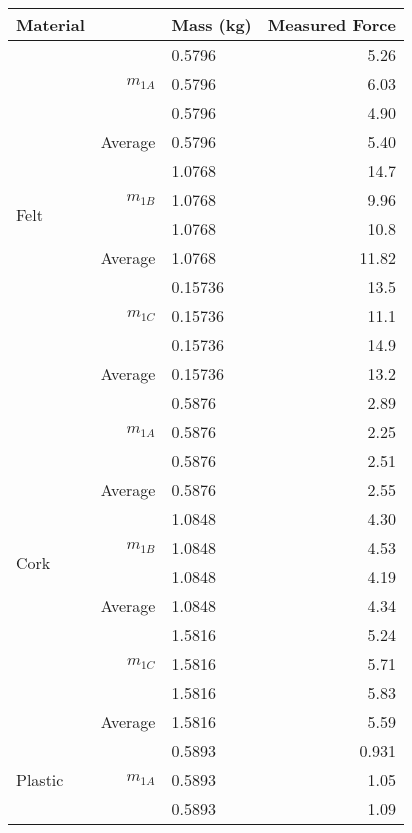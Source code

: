 \documentclass [12pt, letterpaper, twoside] {article}
\begin{document}
\begin {table}[h]
  \centering
  \begin {tabular} {| l | r | l | r |}
    \hline\hline 
    Material & & Mass (kg) & Measured Force \\
    \hline
    \multirow {12}{*}{Felt} & \multirow {3}{*}{\(m_{1A}\)} & 0.5796 & 5.26 \\
    & & 0.5796 & 6.03 \\
    & & 0.5796 & 4.90 \\
    \cline{2-4}
    & Average & 0.5796 & 5.40 \\ %
    \cline{2-4}
    & \multirow {3}{*}{\(m_{1B}\)} & 1.0768 & 14.7 \\
    & & 1.0768 & 9.96 \\
    & & 1.0768 & 10.8 \\
    \cline{2-4}
    & Average & 1.0768 & 11.82 \\
    \cline{2-4}
    & \multirow {3}{*}{\(m_{1C}\)} & 0.15736 & 13.5 \\
    & & 0.15736 & 11.1 \\
    & & 0.15736 & 14.9 \\
    \cline{2-4}
    & Average & 0.15736 & 13.2 \\ %
    \hline
    \multirow {12}{*}{Cork} & \multirow {3}{*}{\(m_{1A}\)} & 0.5876 & 2.89 \\
    & & 0.5876 & 2.25 \\
    & & 0.5876 & 2.51 \\
    \cline{2-4}
    & Average & 0.5876 & 2.55 \\
    \cline{2-4}
    & \multirow {3}{*}{\(m_{1B}\)} & 1.0848 & 4.30 \\
    & & 1.0848 & 4.53 \\
    & & 1.0848 & 4.19 \\
    \cline{2-4}
    & Average & 1.0848 & 4.34 \\
    \cline{2-4}
    & \multirow {3}{*}{\(m_{1C}\)} & 1.5816 & 5.24 \\
    & & 1.5816 & 5.71 \\
    & & 1.5816 & 5.83 \\
    \cline{2-4}
    & Average & 1.5816 & 5.59 \\ %
    \cline{2-4}
    \hline
    \multirow {12}{*}{Plastic} & \multirow {3}{*}{\(m_{1A}\)} & 0.5893 & 0.931 \\
    & & 0.5893 & 1.05 \\
    & & 0.5893 & 1.09 \\
    \cline{2-4}

\end{tabular}
\end{table}
\end{document}
